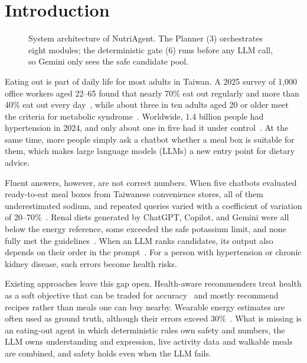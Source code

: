 \section{Introduction}
\label{sec:introduction}

\begin{figure}[t]
    \centering
    
    \caption{System architecture of NutriAgent. The Planner (3) orchestrates
    eight modules; the deterministic gate (6) runs before any LLM call, so
    Gemini only sees the safe candidate pool.}
    \label{fig:architecture}
\end{figure}

Eating out is part of daily life for most adults in Taiwan. A 2025 survey of
1{,}000 office workers aged 22--65 found that nearly 70\% eat out regularly and
more than 40\% eat out every day~\cite{tnf2025survey}, while about three in ten
adults aged 20 or older meet the criteria for metabolic
syndrome~\cite{hpa2026metabolic}. Worldwide, 1.4 billion people had
hypertension in 2024, and only about one in five had it under
control~\cite{who2025hypertension}. At the same time, more people simply ask a
chatbot whether a meal box is suitable for them, which makes large language
models (LLMs) a new entry point for dietary advice.

Fluent answers, however, are not correct numbers. When five chatbots evaluated
ready-to-eat meal boxes from Taiwanese convenience stores, all of them
underestimated sodium, and repeated queries varied with a coefficient of
variation of 20--70\%~\cite{hsuan2025mealbox}. Renal diets generated by
ChatGPT, Copilot, and Gemini were all below the energy reference, some exceeded
the safe potassium limit, and none fully met the
guidelines~\cite{aydincil2026renal}. When an LLM ranks candidates, its output
also depends on their order in the prompt~\cite{hou2024llmrank}. For a person
with hypertension or chronic kidney disease, such errors become health risks.

Existing approaches leave this gap open. Health-aware recommenders treat health as a soft objective that can
be traded for accuracy~\cite{zhang2025mopihfrs,vasantlal2026morla2c} and
mostly recommend recipes rather than meals one can buy nearby. Wearable energy
estimates are often used as ground truth, although their errors exceed
30\%~\cite{germini2022wearable}. What is missing is an eating-out agent in
which deterministic rules own safety and numbers, the LLM owns understanding and
expression, live activity data and walkable meals are combined, and safety
holds even when the LLM fails.

